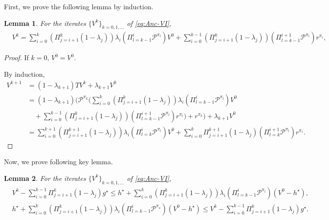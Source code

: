 \documentclass{article} %
\newcommand{\cP}{\mathcal{P}}
\newcommand*{\para}[1]{\left({#1}\right)}
\newtheorem{lemma}{Lemma}
\begin{document}
First, we prove the following lemma by induction.
 \begin{lemma}\label{lem::anc_expansion} For the iterates $\{V^k\}_{k=0,1,\dots}$ of \ref{eq:Anc-VI},
  \begin{align*}
  &V^k= \sum_{i=0}^{k} (\Pi^k_{j=i+1} (1-\lambda_j)) \lambda_{i}\para{\Pi^{i}_{l=k-1}\cP^{\pi_l}}V^0+\sum_{i=0}^{k-1} (\Pi^k_{j=i+1} (1-\lambda_j)) \para{\Pi^{i+1}_{l=k-1}\cP^{\pi_l}}r^{\pi_{i}},
   \end{align*}
  \end{lemma} 
\begin{proof}
   If $k=0$, $V^0=V^0$.
   
   By induction,
\begin{align*}
    V^{k+1}  &=(1-\lambda_{k+1})TV^{k}+ \lambda_{k+1} V^0\\
    & =  (1-\lambda_{k+1})\Bigg(\cP^{\pi_k} \Bigg(\sum_{i=0}^{k} (\Pi^k_{j=i+1} (1-\lambda_j)) \lambda_{i}\para{\Pi^{i}_{l=k-1}\cP^{\pi_l}}V^0 \\& \quad +\sum_{i=0}^{k-1} \para{\Pi^k_{j=i+1} (1-\lambda_j)} \para{\Pi^{i+1}_{l=k-1}\cP^{\pi_l}}r^{\pi_{i}}\Bigg) +r^{\pi_k}\Bigg)+ \lambda_{k+1} V^0\\
    & = \sum_{i=0}^{k+1} (\Pi^{k+1}_{j=i+1} (1-\lambda_j)) \lambda_{i}\para{\Pi^{i}_{l=k}\cP^{\pi_l}}V^0+\sum_{i=0}^{k} \Pi^{k+1}_{j=i+1} (1-\lambda_j) \para{\Pi^{i+1}_{l=k}\cP^{\pi_l}}r^{\pi_{i}}.
\end{align*}   


\end{proof}  
 Now, we prove following key lemma. 
\begin{lemma}\label{lem::anc_normalized_iterate}
For the iterates $\{V^k\}_{k=0,1,\dots}$ of \ref{eq:Anc-VI},
\begin{align*}
     &V^k-\sum_{i=0}^{k-1} \Pi^k_{j=i+1} (1-\lambda_j)g^{\star} \le h^{\star}+\sum_{i=0}^{k} (\Pi^k_{j=i+1} (1-\lambda_j)) \lambda_{i}\para{\Pi^{i}_{l=k-1}\cP^{\pi_l}}(V^0-h^{\star}), 
     \\& h^{\star}+ \sum_{i=0}^{k} (\Pi^k_{j=i+1} (1-\lambda_j)) \lambda_{i}\para{\Pi^{i}_{l=k-1}\cP^{\pi_{\star}}}(V^0-h^{\star}) \le V^k-\sum_{i=0}^{k-1} \Pi^k_{j=i+1} (1-\lambda_j)g^{\star}.
\end{align*}
\end{lemma}
\end{document}
